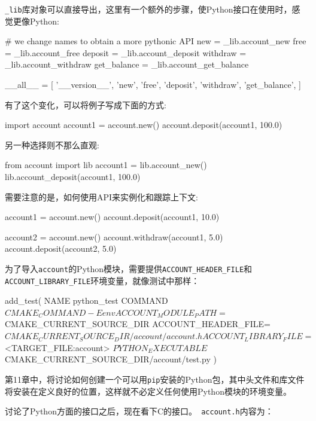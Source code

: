 \texttt{\_lib}库对象可以直接导出，这里有一个额外的步骤，使Python接口在使用时，感觉更像Python:

\begin{codebox}[python]
# we change names to obtain a more pythonic API
new = _lib.account_new
free = _lib.account_free
deposit = _lib.account_deposit
withdraw = _lib.account_withdraw
get_balance = _lib.account_get_balance

__all__ = [
  '__version__',
  'new',
  'free',
  'deposit',
  'withdraw',
  'get_balance',
]
\end{codebox}

有了这个变化，可以将例子写成下面的方式:

\begin{codebox}[python]
import account
account1 = account.new()
account.deposit(account1, 100.0)
\end{codebox}

另一种选择则不那么直观:

\begin{codebox}[python]
from account import lib
account1 = lib.account_new()
lib.account_deposit(account1, 100.0)
\end{codebox}

需要注意的是，如何使用API来实例化和跟踪上下文:

\begin{codebox}[python]
account1 = account.new()
account.deposit(account1, 10.0)

account2 = account.new()
account.withdraw(account1, 5.0)
account.deposit(account2, 5.0)
\end{codebox}

为了导入\texttt{account}的Python模块，需要提供\texttt{ACCOUNT\_HEADER\_FILE}和\texttt{ACCOUNT\_LIBRARY\_FILE}环境变量，就像测试中那样：

\begin{codebox}[cmake]
add_test(
  NAME
    python_test
  COMMAND
    ${CMAKE_COMMAND} -E env ACCOUNT_MODULE_PATH=${CMAKE_CURRENT_SOURCE_DIR}
                        ACCOUNT_HEADER_FILE=${CMAKE_CURRENT_SOURCE_DIR}/account/account.h
                        ACCOUNT_LIBRARY_FILE=$<TARGET_FILE:account>
    ${PYTHON_EXECUTABLE} ${CMAKE_CURRENT_SOURCE_DIR}/account/test.py
  )
\end{codebox}

第11章中，将讨论如何创建一个可以用\texttt{pip}安装的Python包，其中头文件和库文件将安装在定义良好的位置，这样就不必定义任何使用Python模块的环境变量。

讨论了Python方面的接口之后，现在看下C的接口。\texttt{ account.h}内容为：

